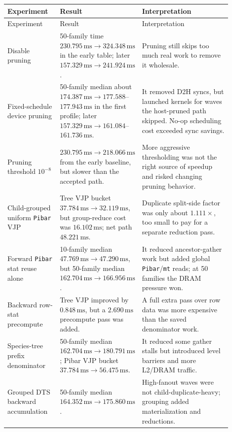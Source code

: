 \documentclass[11pt]{article}
\newcommand{\ms}{\,\mathrm{ms}}
\newcommand{\code}[1]{\texttt{#1}}
\begin{document}
\begin{longtable}{p{0.24\linewidth}p{0.22\linewidth}p{0.44\linewidth}}
\toprule
Experiment & Result & Interpretation \\
\midrule
\endfirsthead
\toprule
Experiment & Result & Interpretation \\
\midrule
\endhead

Disable pruning & 50-family time $230.795\ms \to 324.348\ms$ in the early table; later $157.329\ms \to 241.924\ms$. & Pruning still skips too much real work to remove it wholesale. \\

Fixed-schedule device pruning & 50-family median about $174.387\ms \to 177.588$--$177.943\ms$ in the first profile; later $157.329\ms \to 161.084$--$161.736\ms$. & It removed D2H syncs, but launched kernels for waves the host-pruned path skipped. No-op scheduling cost exceeded sync savings. \\

Pruning threshold $10^{-8}$ & $230.795\ms \to 218.066\ms$ from the early baseline, but slower than the accepted path. & More aggressive thresholding was not the right source of speedup and risked changing pruning behavior. \\

Child-grouped uniform \code{Pibar} VJP & Tree VJP bucket $37.784\ms \to 32.119\ms$, but group-reduce cost was $16.102\ms$; net path $48.221\ms$. & Duplicate split-side factor was only about $1.111\times$, too small to pay for a separate reduction pass. \\

Forward \code{Pibar} stat reuse alone & 10-family median $47.769\ms \to 47.290\ms$, but 50-family median $162.704\ms \to 166.956\ms$. & It reduced ancestor-gather work but added global \code{Pibar}/\code{mt} reads; at 50 families the DRAM pressure won. \\

Backward row-stat precompute & Tree VJP improved by $0.848\ms$, but a $2.690\ms$ precompute pass was added. & A full extra pass over row data was more expensive than the saved denominator work. \\

Species-tree prefix denominator & 50-family median $162.704\ms \to 180.791\ms$; Pibar VJP bucket $37.784\ms \to 56.475\ms$. & It reduced some gather stalls but introduced level barriers and more L2/DRAM traffic. \\

Grouped DTS backward accumulation & 50-family median $164.352\ms \to 175.860\ms$. & High-fanout waves were not child-duplicate-heavy; grouping added materialization and reductions. \\


\end{longtable}
\end{document}
